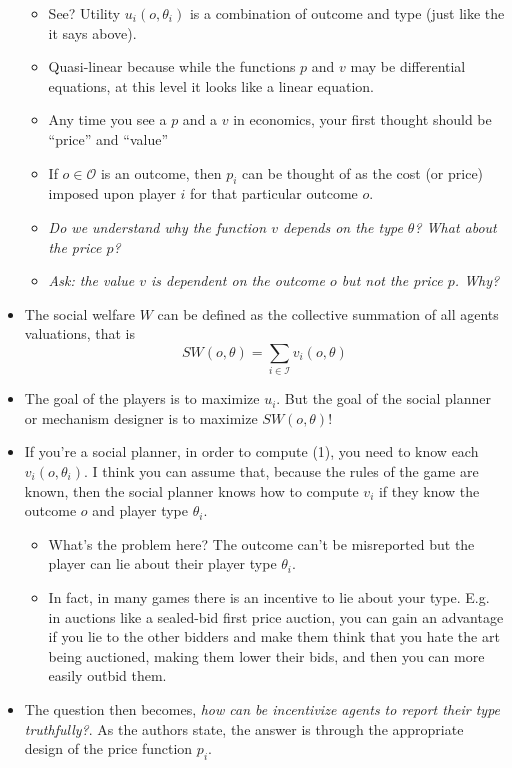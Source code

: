 \documentclass[11pt]{article}
\begin{document}
\begin{itemize}
    \begin{itemize}
        \item See? Utility $u_i(o, \theta_i)$ is a combination of outcome and type (just like the it says above). 
        \item Quasi-linear because while the functions $p$ and $v$ may be differential equations, at this level it looks like a linear equation.
        \item Any time you see a $p$ and a $v$ in economics, your first thought should be ``price'' and ``value''
        \item If $o \in \mathcal{O}$ is an outcome, then $p_i$ can be thought of as the cost (or price) imposed upon player $i$ for that particular outcome $o$. 
        \item {\it Do we understand why the function $v$ depends on the type $\theta$? What about the price $p$?}
        \item {\it Ask: the value $v$ is dependent on the outcome $o$ but not the price $p$. Why?}
    \end{itemize}
    \item The social welfare $W$ can be defined as the collective summation of all agents valuations, that is \begin{equation}SW(o, \theta) = \sum_{i \in \mathcal{I}} v_i(o, \theta)\end{equation}
    \item The goal of the players is to maximize $u_i$. But the goal of the social planner or mechanism designer is to maximize $SW(o, \theta)$!
    \item If you're a social planner, in order to compute (1), you need to know each $v_i(o, \theta_i)$. I think you can assume that, because the rules of the game are known, then the social planner knows how to compute $v_i$ if they know the outcome $o$ and player type $\theta_i$. 
    \begin{itemize}
        \item What's the problem here? The outcome can't be misreported but the player can lie about their player type $\theta_i$. 
        \item In fact, in many games there is an incentive to lie about your type. E.g. in auctions like a sealed-bid first price auction, you can gain an advantage if you lie to the other bidders and make them think that you hate the art being auctioned, making them lower their bids, and then you can more easily outbid them.
    \end{itemize}
    \item The question then becomes, {\it how can be incentivize agents to report their type truthfully?}. As the authors state, the answer is through the appropriate design of the price function $p_i$. 

\end{itemize}
\end{document}
